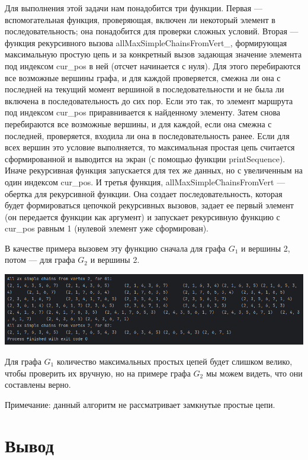 \documentclass[12pt]{article}
\begin{document}
	Для выполнения этой задачи нам понадобится три функции. Первая --- вспомогательная функция, проверяющая, включен ли некоторый элемент в последовательность; она понадобится для проверки сложных условий. Вторая --- функция рекурсивного вызова allMaxSimpleChainsFromVert\_, формирующая максимальную простую цепь и за конкретный вызов задающая значение элемента под индексом cur\_pos в ней (отсчет начинается с нуля). Для этого перебираются все возможные вершины графа, и для каждой проверяется, смежна ли она с последней на текущий момент вершиной в последовательности и не была ли включена в последовательность до сих пор. Если это так, то элемент маршрута под индексом cur\_pos приравнивается к найденному элементу. Затем снова перебираются все возможные вершины, и для каждой, если она смежна с последней, проверяется, входила ли она в последовательность ранее. Если для всех вершин это условие выполняется, то максимальная простая цепь считается сформированной и выводится на экран (с помощью функции printSequence). Иначе рекурсивная функция запускается для тех же данных, но с увеличенным на один индексом cur\_pos. И третья функция, allMaxSimpleChainsFromVert --- обертка для рекурсивной функции. Она создает последовательность, которая будет формироваться цепочкой рекурсивных вызовов, задает ее первый элемент (он передается функции как аргумент) и запускает рекурсивную функцию с cur\_pos равным 1 (нулевой элемент уже сформирован).
	
	В качестве примера вызовем эту функцию сначала для графа $G_1$ и вершины 2, потом --- для графа $G_2$ и вершины 2.
	
	
	\includegraphics[width=170mm]{images/ex7.png} 
	
	Для графа $G_1$ количество максимальных простых цепей будет слишком велико, чтобы проверить их вручную, но на примере графа $G_2$ мы можем видеть, что они составлены верно. 
	
	Примечание: данный алгоритм не рассматривает замкнутые простые цепи.
	
	\section{Вывод}
	\label{final}
	
\end{document}
